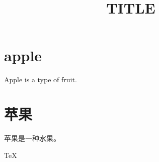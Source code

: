 ﻿\documentclass[a4paper]{article}
\title{TITLE}
\author{}
\date{}
\begin{document}
\tableofcontents


\section{apple}
Apple is a type of fruit.

\section{苹果}
苹果是一种水果。

\TeX

\end{document}
